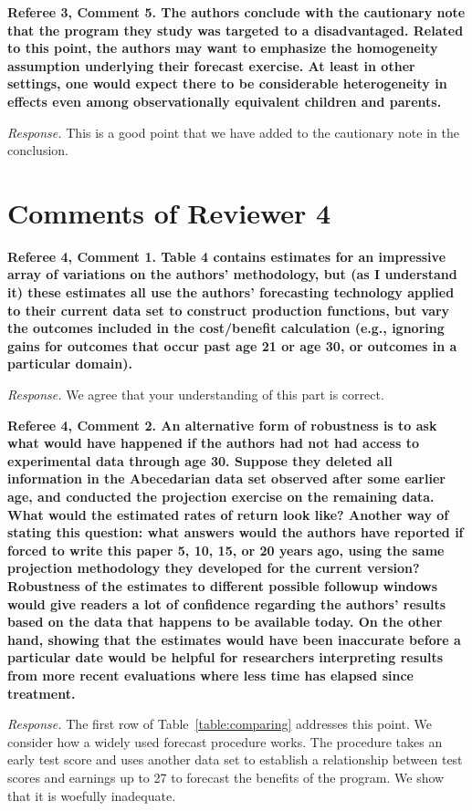 \noindent \textbf{Referee 3, Comment 5. The authors conclude with the cautionary note that the program they study was targeted to a disadvantaged. Related to this point, the authors may want to emphasize the homogeneity assumption underlying their forecast exercise. At least in other settings, one would expect there to be considerable heterogeneity in effects even among observationally equivalent children and parents.}

\noindent \textit{Response.} This is a good point that we have added to the cautionary note in the conclusion.

\section*{Comments of Reviewer 4}

\noindent \textbf{Referee 4, Comment 1. Table 4 contains estimates for an impressive array of variations on the authors' methodology, but (as I understand it) these estimates all use the authors' forecasting technology applied to their current data set to construct production functions, but vary the outcomes included in the cost/benefit calculation (e.g., ignoring gains for outcomes that occur past age 21 or age 30, or outcomes in a particular domain).}

\noindent \textit{Response.} We agree that your understanding of this part is correct.

\noindent \textbf{Referee 4, Comment 2. An alternative form of robustness is to ask what would have happened if the authors had not had access to experimental data through age 30. Suppose they deleted all information in the Abecedarian data set observed after some earlier age, and conducted the projection exercise on the remaining data. What would the estimated rates of return look like? Another way of stating this question: what answers would the authors have reported if forced to write this paper 5, 10, 15, or 20 years ago, using the same projection methodology they developed for the current version? Robustness of the estimates to different possible followup windows would give readers a lot of confidence regarding the authors' results based on the data that happens to be available today. On the other hand, showing that the estimates would have been inaccurate before a particular date would be helpful for researchers interpreting results from more recent evaluations where less time has elapsed since treatment.}

\noindent \textit{Response.} The first row of Table~\ref{table:comparing} addresses this point. We consider how a widely used forecast procedure works. The procedure takes an early test score and uses another data set to establish a relationship between test scores and earnings up to 27 to forecast the benefits of the program. We show that it is woefully inadequate. 

